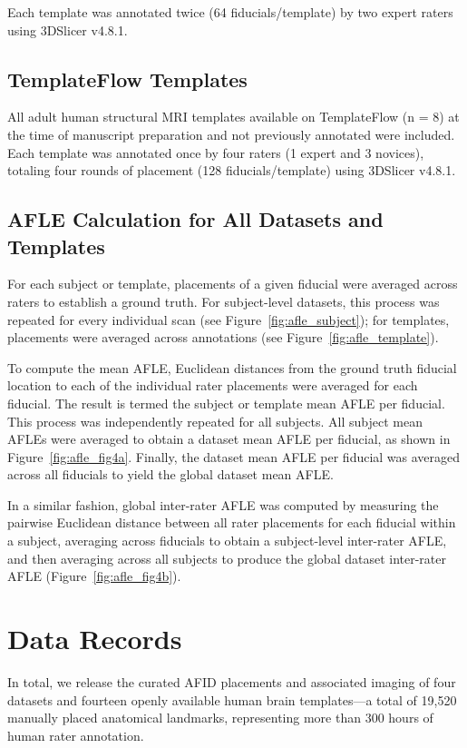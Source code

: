 Each template was annotated twice (64 fiducials/template) by two expert raters using 3DSlicer v4.8.1.

\subsection{TemplateFlow Templates}

All adult human structural MRI templates available on TemplateFlow (n = 8) at the time of manuscript preparation and not previously annotated were included\cite{templateflow}. Each template was annotated once by four raters (1 expert and 3 novices), totaling four rounds of placement (128 fiducials/template) using 3DSlicer v4.8.1.

\subsection{AFLE Calculation for All Datasets and Templates}
For each subject or template, placements of a given fiducial were averaged across raters to establish a ground truth. For subject-level datasets, this process was repeated for every individual scan (see Figure~\ref{fig:afle_subject}); for templates, placements were averaged across annotations (see Figure~\ref{fig:afle_template}).

To compute the mean AFLE, Euclidean distances from the ground truth fiducial location to each of the individual rater placements were averaged for each fiducial. The result is termed the subject or template mean AFLE per fiducial. This process was independently repeated for all subjects. All subject mean AFLEs were averaged to obtain a dataset mean AFLE per fiducial, as shown in Figure~\ref{fig:afle_fig4a}. Finally, the dataset mean AFLE per fiducial was averaged across all fiducials to yield the global dataset mean AFLE. 

In a similar fashion, global inter-rater AFLE was computed by measuring the pairwise Euclidean distance between all rater placements for each fiducial within a subject, averaging across fiducials to obtain a subject-level inter-rater AFLE, and then averaging across all subjects to produce the global dataset inter-rater AFLE (Figure~\ref{fig:afle_fig4b}).

\section{Data Records}
In total, we release the curated AFID placements and associated imaging of four datasets and fourteen openly available human brain templates—a total of 19,520 manually placed anatomical landmarks, representing more than 300 hours of human rater annotation.

